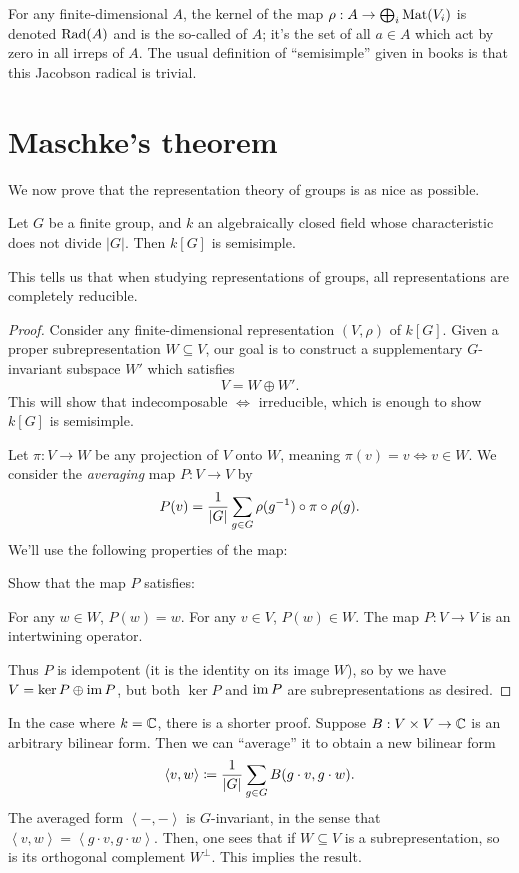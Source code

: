 \begin{remark}
	[Digression]
	For any finite-dimensional $A$, the kernel of the map
	$\rho : A \to \bigoplus_i \mathrm{Mat}(V_i)$ is denoted $\operatorname{Rad}(A)$
	and is the so-called  of $A$;
	it's the set of all $a \in A$ which act by zero in all irreps of $A$.
	The usual definition of ``semisimple'' given in books is that
	this Jacobson radical is trivial.
\end{remark}

\section{Maschke's theorem}
We now prove that the representation theory of groups is as nice as possible.
\begin{theorem}
	Let $G$ be a finite group, and $k$ an algebraically closed
	field whose characteristic does not divide $|G|$.
	Then $k[G]$ is semisimple.
\end{theorem}
This tells us that when studying representations of groups,
all representations are completely reducible.
\begin{proof}
	Consider any finite-dimensional representation $(V, \rho)$ of $k[G]$.
	Given a proper subrepresentation $W \subseteq V$,
	our goal is to construct a supplementary $G$-invariant subspace $W'$
	which satisfies \[ V = W \oplus W'. \]
	This will show that indecomposable $\iff$ irreducible,
	which is enough to show $k[G]$ is semisimple.

	Let $\pi : V \to W$ be any projection of $V$ onto $W$,
	meaning $\pi(v) = v \iff v \in W$.
	We consider the \emph{averaging} map $P : V \to V$ by
	\[ 
		P(v) = \frac{1}{\left\lvert G \right\rvert}
		\sum_{g \in G} \rho(g^{-1}) \circ \pi \circ \rho(g).
	\]
	We'll use the following properties of the map:
	\begin{exercise}
		Show that the map $P$ satisfies:
		\begin{itemize}
			\ii For any $w \in W$, $P(w) = w$.
			\ii For any $v \in V$, $P(w) \in W$.
			\ii The map $P : V \to V$ is an intertwining operator.
		\end{itemize}
	\end{exercise}
	Thus $P$ is idempotent (it is the identity on its image $W$),
	so by  we have $V = \ker P \oplus \operatorname{im} P$,
	but both $\ker P$ and $\operatorname{im} P$ are subrepresentations as desired.
\end{proof}
\begin{remark}
	In the case where $k = \mathbb C$, there is a shorter proof.
	Suppose $B : V \times V \to \mathbb C$ is an arbitrary bilinear form.
	Then we can ``average'' it to obtain a new bilinear form
	\[ \left< v,w \right> \coloneqq \frac{1}{|G|} \sum_{g \in G} B(g \cdot v, g \cdot w). \]
	The averaged form $\left< -,- \right>$ is $G$-invariant,
	in the sense that $\left< v,w \right> = \left< g \cdot v, g \cdot w\right>$.
	Then, one sees that if $W \subseteq V$ is a subrepresentation,
	so is its orthogonal complement $W^\perp$.
	This implies the result.
\end{remark}


